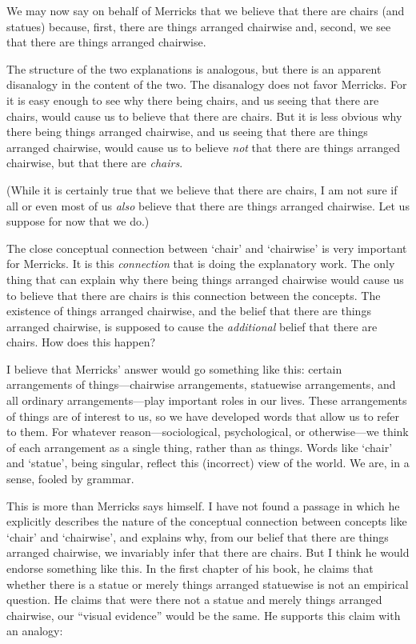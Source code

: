 \documentclass[11pt]{article}
\begin{document}
\begin{spacing}{1.25}
We may now say on behalf of Merricks that we believe that there are
chairs (and statues) because, first, there are things arranged
chairwise and, second, we see that there are things arranged
chairwise.

The structure of the two explanations is analogous, but there is an
apparent disanalogy in the content of the two.  The disanalogy does
not favor Merricks.  For it is easy enough to see why there being
chairs, and us seeing that there are chairs, would cause us to believe
that there are chairs.  But it is less obvious why there being things
arranged chairwise, and us seeing that there are things arranged
chairwise, would cause us to believe {\em not} that there are things
arranged chairwise, but that there are {\em chairs}.

(While it is certainly true that we believe that there are chairs, I
am not sure if all or even most of us {\em also} believe that there
are things arranged chairwise.  Let us suppose for now that we do.)

The close conceptual connection between `chair' and `chairwise' is
very important for Merricks.  It is this {\em connection} that is
doing the explanatory work.  The only thing that can explain why there
being things arranged chairwise would cause us to believe that there
are chairs is this connection between the concepts.  The existence of
things arranged chairwise, and the belief that there are things
arranged chairwise, is supposed to cause the {\em additional} belief
that there are chairs.  How does this happen?

I believe that Merricks' answer would go something like this: certain
arrangements of things---chairwise arrangements, statuewise
arrangements, and all ordinary arrangements---play important roles in
our lives.  These arrangements of things are of interest to us, so we
have developed words that allow us to refer to them.  For whatever
reason---sociological, psychological, or otherwise---we think of each
arrangement as a single thing, rather than as things.  Words like
`chair' and `statue', being singular, reflect this (incorrect) view of
the world.  We are, in a sense, fooled by grammar.

This is more than Merricks says himself.  I have not found a passage
in which he explicitly describes the nature of the conceptual
connection between concepts like `chair' and `chairwise', and explains
why, from our belief that there are things arranged chairwise, we
invariably infer that there are chairs.  But I think he would endorse
something like this.  In the first chapter of his book, he claims that
whether there is a statue or merely things arranged statuewise is not
an empirical question.  He claims that were there not a statue and
merely things arranged chairwise, our ``visual evidence'' would be the
same.  He supports this claim with an analogy:


\end{spacing}
\end{document}
